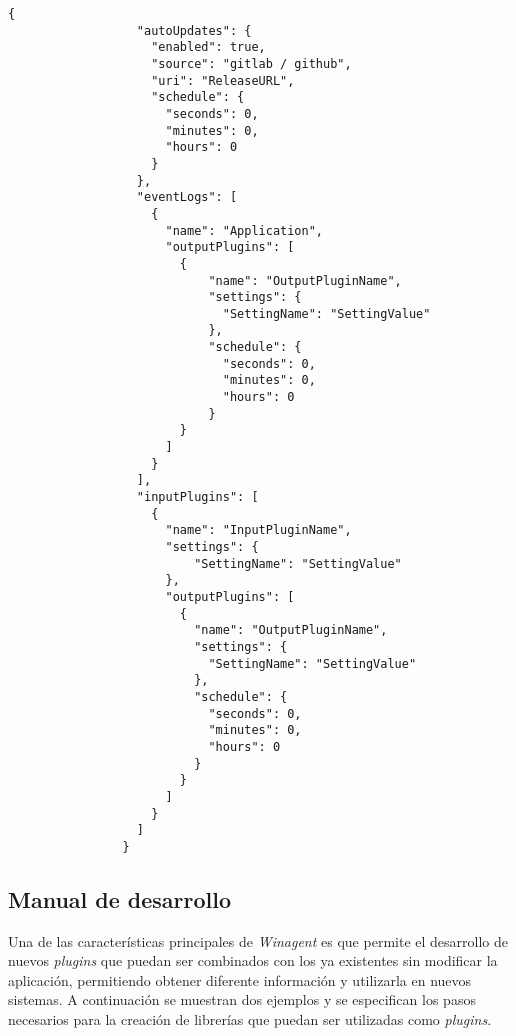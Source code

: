             \begin{lstlisting}[style=csharp, caption=Fichero de configuración]
                {
                  "autoUpdates": {
                    "enabled": true,
                    "source": "gitlab / github",
                    "uri": "ReleaseURL",
                    "schedule": {
                      "seconds": 0,
                      "minutes": 0,
                      "hours": 0
                    }
                  },
                  "eventLogs": [
                    {
                      "name": "Application",
                      "outputPlugins": [
                        {
                            "name": "OutputPluginName",
                            "settings": {
                              "SettingName": "SettingValue"
                            },
                            "schedule": {
                              "seconds": 0,
                              "minutes": 0,
                              "hours": 0
                            }
                        }
                      ]
                    }
                  ],
                  "inputPlugins": [
                    {
                      "name": "InputPluginName",
                      "settings": {
                          "SettingName": "SettingValue"
                      },
                      "outputPlugins": [
                        {
                          "name": "OutputPluginName",
                          "settings": {
                            "SettingName": "SettingValue"
                          },
                          "schedule": {
                            "seconds": 0,
                            "minutes": 0,
                            "hours": 0
                          }
                        }
                      ]
                    }
                  ]
                }
            \end{lstlisting}
            
    \subsection{Manual de desarrollo}
        Una de las características principales de \textit{Winagent} es que permite el desarrollo de nuevos \textit{plugins} que puedan ser combinados con los ya existentes sin modificar la aplicación, permitiendo obtener diferente información y utilizarla en nuevos sistemas. A continuación se muestran dos ejemplos y se especifican los pasos necesarios para la creación de librerías que puedan ser utilizadas como \textit{plugins}.
        
